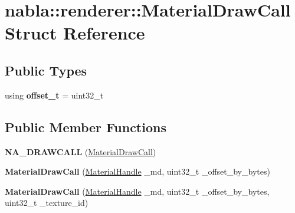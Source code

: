 \hypertarget{structnabla_1_1renderer_1_1_material_draw_call}{}\section{nabla\+::renderer\+::Material\+Draw\+Call Struct Reference}
\label{structnabla_1_1renderer_1_1_material_draw_call}
\subsection*{Public Types}
\begin{DoxyCompactItemize}
\item 
\mbox{\label{structnabla_1_1renderer_1_1_material_draw_call_a3166244a69d5c6506166c6081c788846}} 
using {\bfseries offset\+\_\+t} = uint32\+\_\+t
\end{DoxyCompactItemize}
\subsection*{Public Member Functions}
\begin{DoxyCompactItemize}
\item 
\mbox{\label{structnabla_1_1renderer_1_1_material_draw_call_a71ccbb8fcc01c753bd9439771dbd7ded}} 
{\bfseries N\+A\+\_\+\+D\+R\+A\+W\+C\+A\+LL} (\mbox{\hyperlink{structnabla_1_1renderer_1_1_material_draw_call}{Material\+Draw\+Call}})
\item 
\mbox{\label{structnabla_1_1renderer_1_1_material_draw_call_a30df126ab6455df8934bd4646ea4bcf8}} 
{\bfseries Material\+Draw\+Call} (\mbox{\hyperlink{classnabla_1_1renderer_1_1_handle}{Material\+Handle}} \+\_\+md, uint32\+\_\+t \+\_\+offset\+\_\+by\+\_\+bytes)
\item 
\mbox{\label{structnabla_1_1renderer_1_1_material_draw_call_a38117972d2030fd816bf997471bdb5d3}} 
{\bfseries Material\+Draw\+Call} (\mbox{\hyperlink{classnabla_1_1renderer_1_1_handle}{Material\+Handle}} \+\_\+md, uint32\+\_\+t \+\_\+offset\+\_\+by\+\_\+bytes, uint32\+\_\+t \+\_\+texture\+\_\+id)
\end{DoxyCompactItemize}
